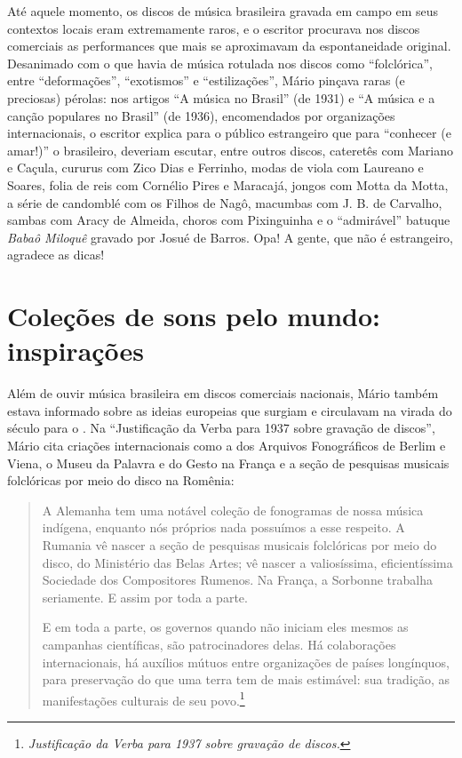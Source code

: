 Até aquele momento, os discos de música brasileira gravada em campo em
seus contextos locais eram extremamente raros, e o escritor procurava
nos discos comerciais as performances que mais se aproximavam da
espontaneidade original. Desanimado com o que havia de música rotulada
nos discos como ``folclórica'', entre ``deformações'', ``exotismos'' e
``estilizações'', Mário pinçava raras (e preciosas) pérolas: nos
artigos ``A música no Brasil'' (de 1931) e ``A música e a canção
populares no Brasil'' (de 1936), encomendados por organizações
internacionais, o escritor explica para o público estrangeiro que para
``conhecer (e amar!)'' o brasileiro, deveriam escutar, entre outros
discos, cateretês com Mariano e Caçula, cururus com Zico Dias e
Ferrinho, modas de viola com Laureano e Soares, folia de reis com
Cornélio Pires e Maracajá, jongos com Motta da Motta, a série de
candomblé com os Filhos de Nagô, macumbas com J. B. de Carvalho, sambas
com Aracy de Almeida, choros com Pixinguinha e o ``admirável'' batuque
\emph{Babaô Miloquê} gravado por Josué de Barros. Opa! A gente, que não
é estrangeiro, agradece as dicas!

\section{Coleções de sons pelo mundo: inspirações}

Além de ouvir música brasileira em discos comerciais nacionais, Mário
também estava informado sobre as ideias europeias que surgiam e
circulavam na virada do século  para o . Na ``Justificação da Verba
para 1937 sobre gravação de discos'', Mário cita criações internacionais
como a dos Arquivos Fonográficos de Berlim e Viena, o Museu da Palavra e
do Gesto na França e a seção de pesquisas musicais folclóricas por meio
do disco na Romênia:

\begin{quote}
A Alemanha tem uma notável coleção de fonogramas de nossa música
indígena, enquanto nós próprios nada possuímos a esse respeito. A
Rumania vê nascer a seção de pesquisas musicais folclóricas por meio do
disco, do Ministério das Belas Artes; vê nascer a valiosíssima,
eficientíssima Sociedade dos Compositores Rumenos. Na França, a Sorbonne
trabalha seriamente. E assim por toda a parte.

E em toda a parte, os governos quando não iniciam eles mesmos as
campanhas científicas, são patrocinadores delas. Há colaborações
internacionais, há auxílios mútuos entre organizações de países
longínquos, para preservação do que uma terra tem de mais estimável: sua
tradição, as manifestações culturais de seu povo.\footnote{\emph{Justificação
  da Verba para 1937 sobre gravação de discos.}}
\end{quote}

